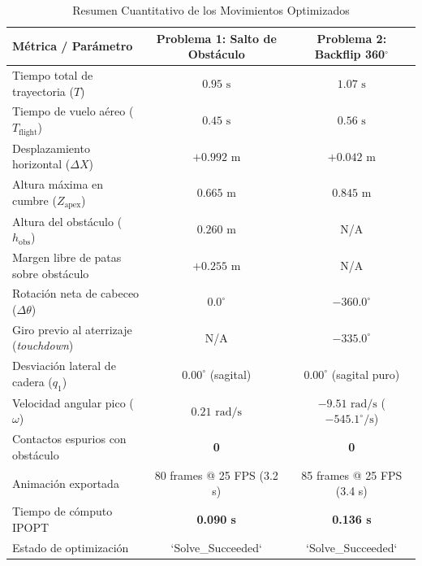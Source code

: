 \documentclass[11pt,a4paper]{article}
\begin{document}
\begin{table}[H]
\centering
\caption{Resumen Cuantitativo de los Movimientos Optimizados}
\label{tab:resumen}
\footnotesize
\begin{tabular}{lcc}
\toprule
\textbf{Métrica / Parámetro} & \textbf{Problema 1: Salto de Obstáculo} & \textbf{Problema 2: Backflip 360$^\circ$} \\
\midrule
Tiempo total de trayectoria ($T$) & $0.95\text{ s}$ & $1.07\text{ s}$ \\
Tiempo de vuelo aéreo ($T_{\text{flight}}$) & $0.45\text{ s}$ & $0.56\text{ s}$ \\
Desplazamiento horizontal ($\Delta X$) & $+0.992\text{ m}$ & $+0.042\text{ m}$ \\
Altura máxima en cumbre ($Z_{\text{apex}}$) & $0.665\text{ m}$ & $0.845\text{ m}$ \\
Altura del obstáculo ($h_{\text{obs}}$) & $0.260\text{ m}$ & N/A \\
Margen libre de patas sobre obstáculo & $+0.255\text{ m}$ & N/A \\
Rotación neta de cabeceo ($\Delta \theta$) & $0.0^\circ$ & $-360.0^\circ$ \\
Giro previo al aterrizaje (\textit{touchdown}) & N/A & $-335.0^\circ$ \\
Desviación lateral de cadera ($q_1$) & $0.00^\circ$ (sagital) & $0.00^\circ$ (sagital puro) \\
Velocidad angular pico ($\omega$) & $0.21\text{ rad/s}$ & $-9.51\text{ rad/s}$ ($-545.1^\circ/\text{s}$) \\
Contactos espurios con obstáculo & \textbf{0} & \textbf{0} \\
Animación exportada & 80 frames @ 25 FPS (3.2 s) & 85 frames @ 25 FPS (3.4 s) \\
Tiempo de cómputo IPOPT & \textbf{0.090 s} & \textbf{0.136 s} \\
Estado de optimización & `Solve\_Succeeded` & `Solve\_Succeeded` \\
\bottomrule
\end{tabular}
\end{table}
\end{document}
